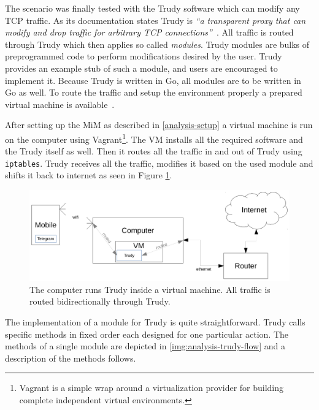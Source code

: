 \documentclass[thesis=M,english]{FITthesis}[2012/10/20]
\begin{document}
The scenario was finally tested with the Trudy software which can modify any TCP traffic. As its documentation states Trudy is \emph{``a transparent proxy that can modify and drop traffic for arbitrary TCP connections''}~\cite{github-trudy}. All traffic is routed through Trudy which then applies so called \emph{modules}. Trudy modules are bulks of preprogrammed code to perform modifications desired by the user. Trudy provides an example stub of such a module, and users are encouraged to implement it. Because Trudy is written in Go, all modules are to be written in Go as well. To route the traffic and setup the environment properly a prepared virtual machine is available~\cite{github-trudy-vm}.

After setting up the MiM as described in \ref{analysis-setup} a virtual machine is run on the computer using Vagrant\footnote{Vagrant is a simple wrap around a virtualization provider for building complete independent virtual environments.}. The VM installs all the required software and the Trudy itself as well. Then it routes all the traffic in and out of Trudy using \texttt{iptables}. Trudy receives all the traffic, modifies it based on the used module and shifts it back to internet as seen in Figure \ref{img:analysis-trudy-setup}.

\begin{figure}[htb]
	\centering
	\includegraphics[width=1\textwidth]{setup-trudy.pdf}
	\caption[Trudy setup]{The computer runs Trudy inside a virtual machine. All traffic is routed bidirectionally through Trudy.}
	\label{img:analysis-trudy-setup}
\end{figure}


The implementation of a module for Trudy is quite straightforward. Trudy calls specific methods in fixed order each designed for one particular action. The methods of a single module are depicted in \ref{img:analysis-trudy-flow} and a description of the methods follows.
\end{document}
